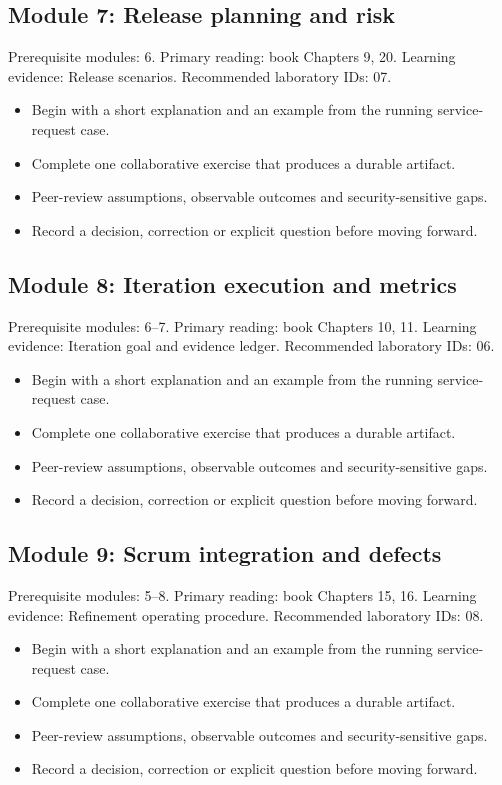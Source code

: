 \documentclass[11pt,letterpaper]{article}
\begin{document}
\subsection{Module 7: Release planning and risk}
Prerequisite modules: 6. Primary reading: book Chapters 9, 20. Learning evidence: Release scenarios. Recommended laboratory IDs: 07.

\begin{itemize}[leftmargin=*,itemsep=2pt]
\item Begin with a short explanation and an example from the running service-request case.
\item Complete one collaborative exercise that produces a durable artifact.
\item Peer-review assumptions, observable outcomes and security-sensitive gaps.
\item Record a decision, correction or explicit question before moving forward.
\end{itemize}
\subsection{Module 8: Iteration execution and metrics}
Prerequisite modules: 6–7. Primary reading: book Chapters 10, 11. Learning evidence: Iteration goal and evidence ledger. Recommended laboratory IDs: 06.

\begin{itemize}[leftmargin=*,itemsep=2pt]
\item Begin with a short explanation and an example from the running service-request case.
\item Complete one collaborative exercise that produces a durable artifact.
\item Peer-review assumptions, observable outcomes and security-sensitive gaps.
\item Record a decision, correction or explicit question before moving forward.
\end{itemize}
\subsection{Module 9: Scrum integration and defects}
Prerequisite modules: 5–8. Primary reading: book Chapters 15, 16. Learning evidence: Refinement operating procedure. Recommended laboratory IDs: 08.

\begin{itemize}[leftmargin=*,itemsep=2pt]
\item Begin with a short explanation and an example from the running service-request case.
\item Complete one collaborative exercise that produces a durable artifact.
\item Peer-review assumptions, observable outcomes and security-sensitive gaps.
\item Record a decision, correction or explicit question before moving forward.
\end{itemize}
\end{document}
